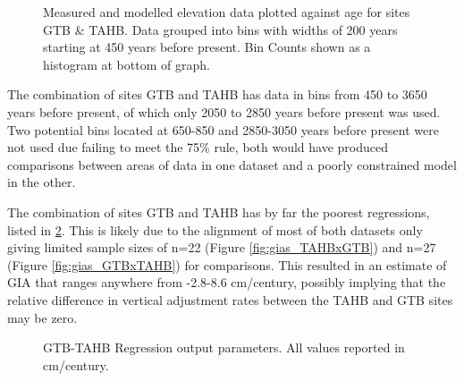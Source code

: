 \begin{figure}[H]
	\caption{Measured and modelled elevation data plotted against age for sites GTB \& TAHB. Data grouped into bins with widths of 200 years starting at 450 years before present. Bin Counts shown as a histogram at bottom of graph.}	
	\label{fig:data_GTBxTAHB}
\end{figure}
The combination of sites GTB and TAHB has data in bins from 450 to 3650 years before
present, of which only 2050 to 2850 years before present was used. Two
potential bins located at 650-850 and 2850-3050 years before present were not used due failing to
meet the 75\% rule, both would have produced comparisons between areas of
data in one dataset and a poorly constrained model in the other.

The combination of sites GTB and TAHB has by far the poorest regressions, listed
in \ref{fig:GTBxTAHB_regression}. This is likely due to the alignment of most
of both datasets only giving limited sample sizes of n=22 (Figure \ref{fig:gias_TAHBxGTB})
and n=27 (Figure \ref{fig:gias_GTBxTAHB}) for comparisons. 
This resulted in an estimate of GIA that ranges anywhere from -2.8-8.6 cm/century,
possibly implying that the relative difference in vertical adjustment rates
between the TAHB and GTB sites may be zero. \\

\begin{figure}[H]
	\begin{flushleft}
	\end{flushleft}
	\caption{GTB-TAHB Regression output parameters. All values reported in cm/century.}
	\label{fig:GTBxTAHB_regression}
\end{figure}

